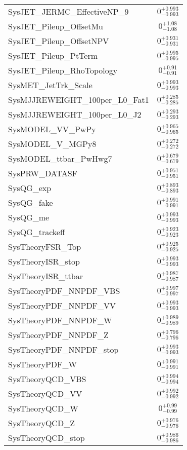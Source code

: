\begin{tabular}{|l|c|}
SysJET\_JERMC\_EffectiveNP\_9 & $0^{+0.993}_{-0.993}$ \\
SysJET\_Pileup\_OffsetMu & $0^{+1.08}_{-1.08}$ \\
SysJET\_Pileup\_OffsetNPV & $0^{+0.931}_{-0.931}$ \\
SysJET\_Pileup\_PtTerm & $0^{+0.995}_{-0.995}$ \\
SysJET\_Pileup\_RhoTopology & $0^{+0.91}_{-0.91}$ \\
SysMET\_JetTrk\_Scale & $0^{+0.993}_{-0.993}$ \\
SysMJJREWEIGHT\_100per\_L0\_Fat1 & $0^{+0.285}_{-0.285}$ \\
SysMJJREWEIGHT\_100per\_L0\_J2 & $0^{+0.293}_{-0.293}$ \\
SysMODEL\_VV\_PwPy & $0^{+0.965}_{-0.965}$ \\
SysMODEL\_V\_MGPy8 & $0^{+0.272}_{-0.272}$ \\
SysMODEL\_ttbar\_PwHwg7 & $0^{+0.679}_{-0.679}$ \\
SysPRW\_DATASF & $0^{+0.951}_{-0.951}$ \\
SysQG\_exp & $0^{+0.893}_{-0.893}$ \\
SysQG\_fake & $0^{+0.991}_{-0.991}$ \\
SysQG\_me & $0^{+0.993}_{-0.993}$ \\
SysQG\_trackeff & $0^{+0.923}_{-0.923}$ \\
SysTheoryFSR\_Top & $0^{+0.925}_{-0.925}$ \\
SysTheoryISR\_stop & $0^{+0.993}_{-0.993}$ \\
SysTheoryISR\_ttbar & $0^{+0.987}_{-0.987}$ \\
SysTheoryPDF\_NNPDF\_VBS & $0^{+0.997}_{-0.997}$ \\
SysTheoryPDF\_NNPDF\_VV & $0^{+0.993}_{-0.993}$ \\
SysTheoryPDF\_NNPDF\_W & $0^{+0.989}_{-0.989}$ \\
SysTheoryPDF\_NNPDF\_Z & $0^{+0.796}_{-0.796}$ \\
SysTheoryPDF\_NNPDF\_stop & $0^{+0.993}_{-0.993}$ \\
SysTheoryPDF\_W & $0^{+0.991}_{-0.991}$ \\
SysTheoryQCD\_VBS & $0^{+0.994}_{-0.994}$ \\
SysTheoryQCD\_VV & $0^{+0.992}_{-0.992}$ \\
SysTheoryQCD\_W & $0^{+0.99}_{-0.99}$ \\
SysTheoryQCD\_Z & $0^{+0.976}_{-0.976}$ \\
SysTheoryQCD\_stop & $0^{+0.986}_{-0.986}$ \\

\end{tabular}
